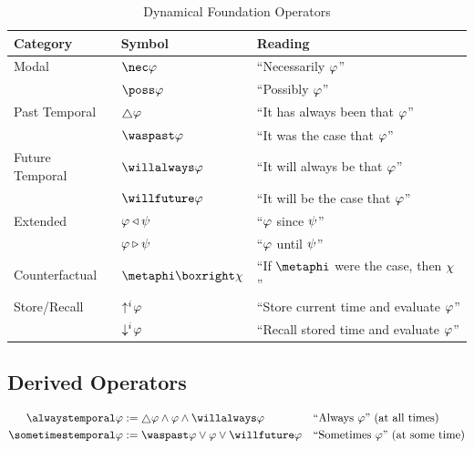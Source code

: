 \documentclass[../LogosReference.tex]{subfiles}
\begin{document}
\begin{table}[h]
	\centering
	\begin{tabular}{lll}
		\toprule
		\textbf{Category} & \textbf{Symbol}             & \textbf{Reading}                               \\
		\midrule
		Modal             & $\nec\metaA$                & ``Necessarily $\varphi$''                       \\
		                  & $\poss\metaA$               & ``Possibly $\varphi$''                          \\
		\midrule
		Past Temporal     & $\always\metaA$             & ``It has always been that $\varphi$''           \\
		                  & $\waspast\metaA$            & ``It was the case that $\varphi$''              \\
		\midrule
		Future Temporal   & $\willalways\metaA$         & ``It will always be that $\varphi$''            \\
		                  & $\willfuture\metaA$         & ``It will be the case that $\varphi$''          \\
		\midrule
		Extended          & $\varphi \triangleleft \psi$      & ``$\varphi$ since $\psi$''                    \\
		                  & $\varphi \triangleright \psi$      & ``$\varphi$ until $\psi$''                    \\
		\midrule
		Counterfactual    & $\metaphi \boxright \metaC$ & ``If $\metaphi$ were the case, then $\chi$'' \\
		\midrule
		Store/Recall      & $\uparrow^{i}\hspace{-2pt}\varphi$           & ``Store current time and evaluate $\varphi$''   \\
		                  & $\downarrow^{i}\hspace{-2pt}\varphi$          & ``Recall stored time and evaluate $\varphi$''   \\
		\bottomrule
	\end{tabular}
	\caption{Dynamical Foundation Operators}
	\label{tab:core-operators}
\end{table}


\subsection{Derived Operators}\label{sec:derived-operators}

\begin{definition}\label{def:derived-temporal}
	\begin{align}
		\alwaystemporal\metaA    & := \always\metaA \land \metaA \land \willalways\metaA &  & \text{``Always $\metaA$'' (at all times)}    \\
		\sometimestemporal\metaA & := \waspast\metaA \lor \metaA \lor \willfuture\metaA  &  & \text{``Sometimes $\metaA$'' (at some time)}
	\end{align}
\end{definition}
\end{document}
